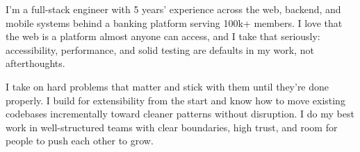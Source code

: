 
I'm a full-stack engineer with 5 years' experience across the web, backend, and mobile systems behind a banking platform serving 100k+ members. I love that the web is a platform almost anyone can access, and I take that seriously: accessibility, performance, and solid testing are defaults in my work, not afterthoughts.

I take on hard problems that matter and stick with them until they're done properly. I build for extensibility from the start and know how to move existing codebases incrementally toward cleaner patterns without disruption. I do my best work in well-structured teams with clear boundaries, high trust, and room for people to push each other to grow.
